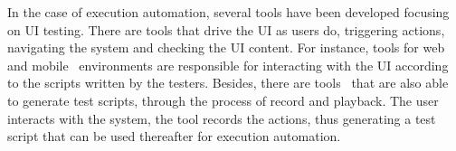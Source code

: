 \documentclass{chi-ext}
\begin{document}
In the case of execution automation, several tools have been developed focusing on UI testing. There are tools that drive the UI as users do, triggering actions, navigating the system and checking the UI content. For instance, tools for web~\cite{watir, cucumber} and mobile~\cite{appium, selendroid} environments are responsible for interacting with the UI according to the scripts written by the testers. Besides, there are tools~\cite{selenium, monkeytalk} that are also able to generate test scripts, through the process of record and playback. The user interacts with the system, the tool records the actions, thus generating a test script that can be used thereafter for execution automation.

\end{document}
